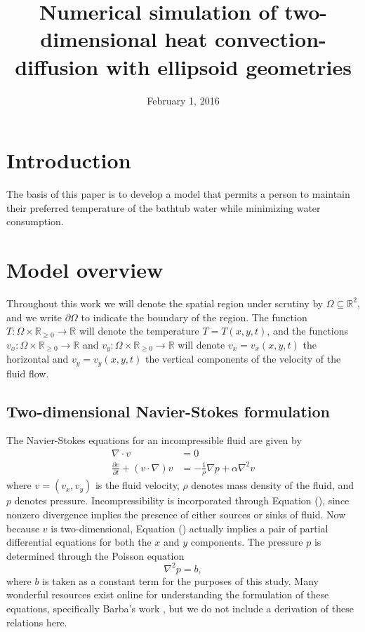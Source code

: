 \documentclass[12pt]{amsart}
\title{Numerical simulation of two-dimensional heat convection-diffusion with
ellipsoid geometries}
\date{February 1, 2016}
\newcommand{\R}{\mathbb{R}}
\begin{document}
\maketitle

\thispagestyle{fancy}
\tableofcontents

\begin{abstract}
\end{abstract}

\section{Introduction}

The basis of this paper is to develop a model that permits a person to maintain their preferred temperature of the bathtub water while minimizing water consumption.    

\section{Model overview}

Throughout this work we will denote the spatial region under scrutiny by
$\Omega \subseteq \R^2$, and we write $\partial \Omega$ to indicate the
boundary of the region. The function $T : \Omega \times \R_{\geq 0} \to \R$
will denote the temperature $T = T(x,y,t)$, and the functions $v_x : \Omega
\times \R_{\geq 0} \to \R$ and $v_y : \Omega \times \R_{\geq 0} \to \R$ will
denote $v_x = v_x(x,y,t)$ the horizontal and $v_y = v_y(x,y,t)$ the vertical
components of the velocity of the fluid flow. 

\subsection{Two-dimensional Navier-Stokes formulation}

The Navier-Stokes equations for an incompressible fluid are given by
\begin{align}
    \nabla \cdot v &= 0 \\
    \frac{\partial v}{\partial t} + (v \cdot \nabla) v &= -
    \frac{1}{\rho} \nabla p + \alpha \nabla^2 v
    \label{eq:\theequation}
\end{align}
where $v = (v_x, v_y)$ is the fluid velocity, $\rho$ denotes mass density of
the fluid, and $p$ denotes pressure. Incompressibility is incorporated
through Equation (), since nonzero divergence implies the presence of either
sources or sinks of fluid. Now because $v$ is two-dimensional, Equation
() actually implies a pair of partial differential equations for both the $x$
and $y$ components. The pressure $p$ is determined through the Poisson equation
\begin{equation}
    \nabla^2 p = b,
    \label{eq:\theequation}
\end{equation}
where $b$ is taken as a constant term for the purposes of this study. Many
wonderful resources exist online for understanding the formulation of these
equations, specifically Barba's work \cite{12-steps}, but we do not include a
derivation of these relations here.
\end{document}
